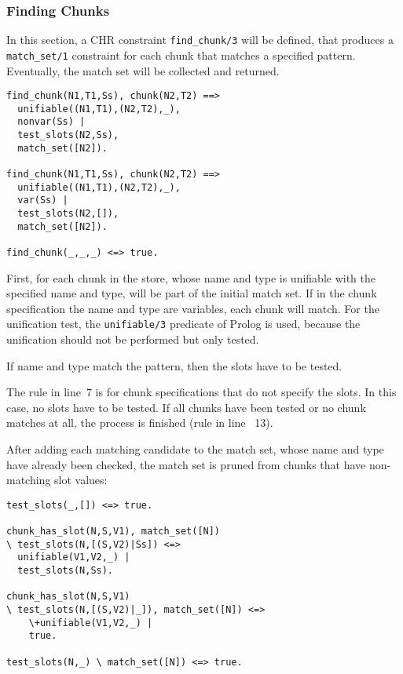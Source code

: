 \subsubsection{Finding Chunks}

In this section, a CHR constraint \verb|find_chunk/3| will be defined, that produces a \verb|match_set/1| constraint for each chunk that matches a specified pattern. Eventually, the match set will be collected and returned.

\begin{lstlisting}
find_chunk(N1,T1,Ss), chunk(N2,T2) ==> 
  unifiable((N1,T1),(N2,T2),_), 
  nonvar(Ss) | 
  test_slots(N2,Ss), 
  match_set([N2]).
  
find_chunk(N1,T1,Ss), chunk(N2,T2) ==> 
  unifiable((N1,T1),(N2,T2),_), 
  var(Ss) | 
  test_slots(N2,[]), 
  match_set([N2]).

find_chunk(_,_,_) <=> true.
\end{lstlisting}

First, for each chunk in the store, whose name and type is unifiable with the specified name and type, will be part of the initial match set. If in the chunk specification the name and type are variables, each chunk will match. For the unification test, the \verb|unifiable/3| predicate of Prolog is used, because the unification should not be performed but only tested. 

If name and type match the pattern, then the slots have to be tested.

The rule in line~7 is for chunk specifications that do not specify the slots. In this case, no slots have to be tested. If all chunks have been tested or no chunk matches at all, the process is finished (rule in line ~13).

After adding each matching candidate to the match set, whose name and type have already been checked, the match set is pruned from chunks that have non-matching slot values:

\begin{lstlisting}
test_slots(_,[]) <=> true.

chunk_has_slot(N,S,V1), match_set([N]) 
\ test_slots(N,[(S,V2)|Ss]) <=> 
  unifiable(V1,V2,_) | 
  test_slots(N,Ss).

chunk_has_slot(N,S,V1) 
\ test_slots(N,[(S,V2)|_]), match_set([N]) <=> 
    \+unifiable(V1,V2,_) | 
    true.

test_slots(N,_) \ match_set([N]) <=> true.
\end{lstlisting}

